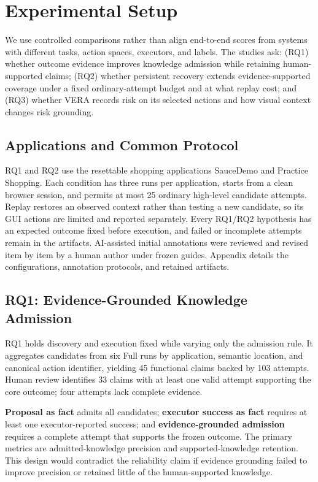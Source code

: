 \section{Experimental Setup}
\label{sec:experiments}

We use controlled comparisons rather than align end-to-end scores from systems
with different tasks, action spaces, executors, and labels. The studies ask:
(RQ1) whether outcome evidence improves knowledge admission while retaining
human-supported claims; (RQ2) whether persistent recovery extends
evidence-supported coverage under a fixed ordinary-attempt budget and at what
replay cost; and (RQ3) whether VERA records risk on its selected actions and how
visual context changes risk grounding.

\subsection{Applications and Common Protocol}

RQ1 and RQ2 use the resettable shopping applications SauceDemo and Practice
Shopping. Each condition has three runs per application, starts from a clean
browser session, and permits at most 25 ordinary high-level candidate attempts.
Replay restores an observed context rather than testing a new candidate, so its
GUI actions are limited and reported separately. Every RQ1/RQ2 hypothesis has
an expected outcome fixed before execution, and failed or incomplete attempts
remain in the artifacts. AI-assisted initial annotations were reviewed and
revised item by item by a human author under frozen guides. Appendix details
the configurations, annotation protocols, and retained artifacts.

\subsection{RQ1: Evidence-Grounded Knowledge Admission}

RQ1 holds discovery and execution fixed while varying only the admission rule.
It aggregates candidates from six Full runs by application, semantic location,
and canonical action identifier, yielding 45 functional claims backed by 103
attempts. Human review identifies 33 claims with at least one valid attempt
supporting the core outcome; four attempts lack complete evidence.

\textbf{Proposal as fact} admits all candidates; \textbf{executor success as
fact} requires at least one executor-reported success; and
\textbf{evidence-grounded admission} requires a complete attempt that supports
the frozen outcome. The primary metrics are admitted-knowledge precision and
supported-knowledge retention. This design would contradict the reliability
claim if evidence grounding failed to improve precision or retained little of
the human-supported knowledge.

